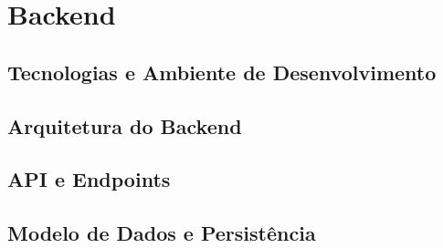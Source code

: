 
\chapter{Backend}
\label{chap:backend}


\section{Tecnologias e Ambiente de Desenvolvimento}
\label{sec:tecnologias-backend}


\section{Arquitetura do Backend}
\label{sec:arquitetura-backend}


\section{API e Endpoints}
\label{sec:api-endpoints}



\section{Modelo de Dados e Persistência}
\label{sec:modelo-dados-backend}

